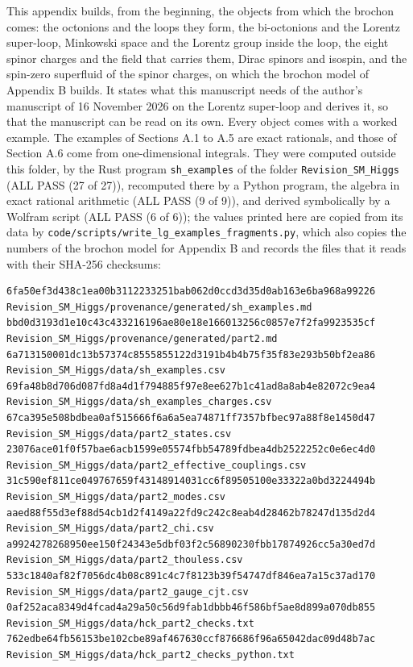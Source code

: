 \documentclass[
  10pt,
]{article}
\begin{document}
This appendix builds, from the beginning, the objects from which the
brochon comes: the octonions and the loops they form, the bi-octonions
and the Lorentz super-loop, Minkowski space and the Lorentz group inside
the loop, the eight spinor charges and the field that carries them,
Dirac spinors and isospin, and the spin-zero superfluid of the spinor
charges, on which the brochon model of Appendix B builds. It states what
this manuscript needs of the author's manuscript of 16 November 2026 on
the Lorentz super-loop and derives it, so that the manuscript can be
read on its own. Every object comes with a worked example. The examples
of Sections A.1 to A.5 are exact rationals, and those of Section A.6
come from one-dimensional integrals. They were computed outside this
folder, by the Rust program \texttt{sh\_examples} of the folder
\texttt{Revision\_SM\_Higgs} (ALL PASS (27 of 27)), recomputed there by
a Python program, the algebra in exact rational arithmetic (ALL PASS (9
of 9)), and derived symbolically by a Wolfram script (ALL PASS (6 of
6)); the values printed here are copied from its data by
\texttt{code/scripts/write\_lg\_examples\_fragments.py}, which also
copies the numbers of the brochon model for Appendix B and records the
files that it reads with their SHA-256 checksums:

\begin{verbatim}
6fa50ef3d438c1ea00b3112233251bab062d0ccd3d35d0ab163e6ba968a99226  Revision_SM_Higgs/provenance/generated/sh_examples.md
bbd0d3193d1e10c43c433216196ae80e18e166013256c0857e7f2fa9923535cf  Revision_SM_Higgs/provenance/generated/part2.md
6a713150001dc13b57374c8555855122d3191b4b4b75f35f83e293b50bf2ea86  Revision_SM_Higgs/data/sh_examples.csv
69fa48b8d706d087fd8a4d1f794885f97e8ee627b1c41ad8a8ab4e82072c9ea4  Revision_SM_Higgs/data/sh_examples_charges.csv
67ca395e508bdbea0af515666f6a6a5ea74871ff7357bfbec97a88f8e1450d47  Revision_SM_Higgs/data/part2_states.csv
23076ace01f0f57bae6acb1599e05574fbb54789fdbea4db2522252c0e6ec4d0  Revision_SM_Higgs/data/part2_effective_couplings.csv
31c590ef811ce049767659f43148914031cc6f89505100e33322a0bd3224494b  Revision_SM_Higgs/data/part2_modes.csv
aaed88f55d3ef88d54cb1d2f4149a22fd9c242c8eab4d28462b78247d135d2d4  Revision_SM_Higgs/data/part2_chi.csv
a9924278268950ee150f24343e5dbf03f2c56890230fbb17874926cc5a30ed7d  Revision_SM_Higgs/data/part2_thouless.csv
533c1840af82f7056dc4b08c891c4c7f8123b39f54747df846ea7a15c37ad170  Revision_SM_Higgs/data/part2_gauge_cjt.csv
0af252aca8349d4fcad4a29a50c56d9fab1dbbb46f586bf5ae8d899a070db855  Revision_SM_Higgs/data/hck_part2_checks.txt
762edbe64fb56153be102cbe89af467630ccf876686f96a65042dac09d48b7ac  Revision_SM_Higgs/data/hck_part2_checks_python.txt
\end{verbatim}
\end{document}
